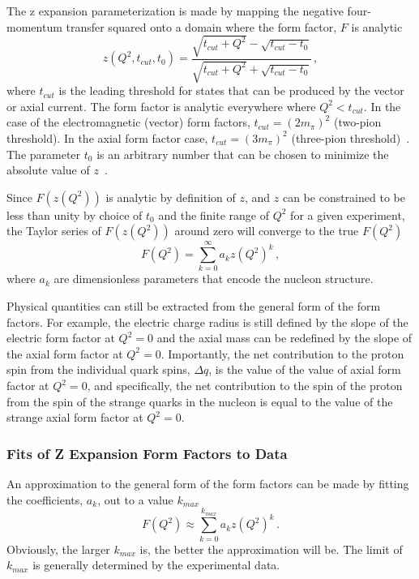   The z expansion parameterization is made by mapping the negative
  four-momentum transfer squared onto a domain where the form factor, $F$ is
  analytic
  \begin{equation}\label{eq:zdef}
    z(Q^2,t_{cut},t_0) = 
    \frac{\sqrt{t_{cut}+Q^2} - \sqrt{t_{cut} - t_0}}{\sqrt{t_{cut}+Q^2} + \sqrt{t_{cut} - t_0}} \,,
  \end{equation}
  where $t_{cut}$ is the leading threshold for states that can be produced by
  the vector or axial current. The form factor is analytic everywhere where
  $Q^2 < t_{cut}$.  In the case of the electromagnetic (vector) form factors,
  $t_{cut} = (2m_{\pi})^2$ (two-pion threshold). In the axial form factor case,
  $t_{cut} = (3m_{\pi})^2$ (three-pion threshold)~\cite{Federbush:1958zz}. The
  parameter $t_0$ is an arbitrary number that can be chosen to minimize the
  absolute value of $z$~\cite{Meyer:2016oeg}.

  Since $F(z(Q^2))$ is analytic by definition of $z$, and $z$ can be
  constrained to be less than unity by choice of $t_0$ and the finite range of
  $Q^2$ for a given experiment, the Taylor series of $F(z(Q^2))$ around zero
  will converge to the true $F(Q^2)$
  \begin{equation}
    F(Q^2) = \sum_{k=0}^{\infty}a_{k}z(Q^2)^k \,,
  \end{equation}
  where $a_k$ are dimensionless parameters that encode the nucleon structure.

  Physical quantities can still be extracted from the general form of the form
  factors. For example, the electric charge radius is still defined by the
  slope of the electric form factor at $Q^2 = 0$ and the axial mass can be
  redefined by the slope of the axial form factor at $Q^2 = 0$.  Importantly,
  the net contribution to the proton spin from the individual quark spins,
  $\Delta q$, is the value of the value of axial form factor at $Q^2 = 0$, and
  specifically, the net contribution to the spin of the proton from the spin of
  the strange quarks in the nucleon is equal to the value of the strange axial
  form factor at $Q^2 = 0$.

  \subsubsection{Fits of Z Expansion Form Factors to Data}

  An approximation to the general form of the form factors can be made by
  fitting the coefficients, $a_k$, out to a value $k_{max}$
  \begin{equation}
    F(Q^2) \approx \sum_{k=0}^{k_{max}} a_{k}z(Q^2)^k \,.
  \end{equation}
  Obviously, the larger $k_{max}$ is, the better the approximation will be. The
  limit of $k_{max}$ is generally determined by the experimental data.

